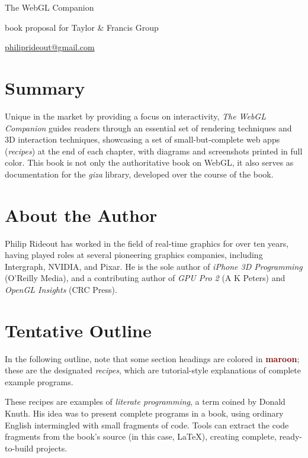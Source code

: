 \thispagestyle{empty}
\label{Proposal}
\LARGE

\noindent The WebGL Companion


\vspace{0.25in}
\noindent book proposal for Taylor \& Francis Group

\noindent \href{mailto:philiprideout@gmail.com}{philiprideout@gmail.com}
\normalsize

\renewcommand{\labelenumi}{Chapter \arabic{enumi}. }

\section*{Summary}
Unique in the market by providing a focus on interactivity, \emph{The WebGL Companion} guides readers through an essential set of rendering techniques and 3D interaction techniques, showcasing a set of small-but-complete web apps (\emph{recipes}) at the end of each chapter, with diagrams and screenshots printed in full color.  This book is not only the authoritative book on WebGL, it also serves as documentation for the \emph{giza} library, developed over the course of the book.

\section*{About the Author}

Philip Rideout has worked in the field of real-time graphics for over ten years, having played roles at several pioneering graphics companies, including Intergraph, NVIDIA, and Pixar.  He is the sole author of \emph{iPhone 3D Programming} (O'Reilly Media), and a contributing author of \emph{GPU Pro 2} (A K Peters) and \emph{OpenGL Insights} (CRC Press).

\section*{Tentative Outline}

In the following outline, note that some section headings are colored in \textbf{\textcolor{Maroon}{maroon}}; these are the designated \emph{recipes}, which are tutorial-style explanations of complete example programs.

These recipes are examples of \emph{literate programming}, a term coined by Donald Knuth.  His idea was to present complete programs in a book, using ordinary English intermingled with small fragments of code.  Tools can extract the code fragments from the book's source (in this case, \LaTeX), creating complete, ready-to-build projects.

